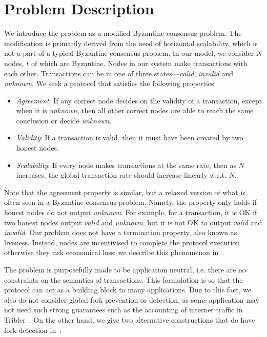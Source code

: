\section{Problem Description}
\label{sec:description}
We introduce the problem as a modified Byzantine consensus problem.
The modification is primarily derived from the need of horizontal scalability,
which is not a part of a typical Byzantine consensus problem.
In our model, we consider $N$ nodes, $t$ of which are Byzantine.
Nodes in our system make transactions with each other.
Transactions can be in one of three states---\emph{valid}, \emph{invalid} and \emph{unknown}.
We seek a protocol that satisfies the following properties.
\begin{itemize}
    \item \emph{Agreement}:
        If any correct node decides on the validity of a transaction, except when it is \emph{unknown},
        then all other correct nodes are able to reach the same conclusion or decide \emph{unknown}.
    \item \emph{Validity}:
        If a transaction is valid, then it must have been created by two honest nodes.
    \item \emph{Scalability}:
        If every node makes transactions at the same rate,
        then as $N$ increases,
        the global transaction rate should increase linearly w.r.t. $N$.
\end{itemize}

Note that the agreement property is similar, but a relaxed version of what is often seen in a Byzantine consensus problem.
Namely, the property only holds if honest nodes do not output \emph{unknown}.
For example, for a transaction, it is OK if two honest nodes output \emph{valid} and \emph{unknown}, but it is not OK to output \emph{valid} and \emph{invalid}.
Our problem does not have a termination property, also known as liveness.
Instead, nodes are incentivised to complete the protocol execution otherwise they risk economical loss;
we describe this phenomenon in~.

The problem is purposefully made to be application neutral,
i.e. there are no constraints on the semantics of transactions.
This formulation is so that the protocol can act as a building block to many applications.
Due to this fact, we also do not consider global fork prevention or detection,
as some application may not need such strong guarantees such as the accounting of internet traffic in Tribler~\cite{pimotte, pouwelse2008tribler}.
On the other hand, we give two alternative constructions that do have fork detection in~.

